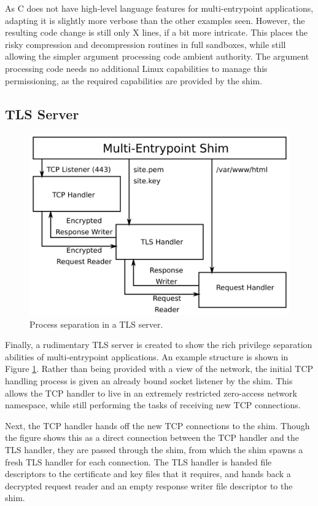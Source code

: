 \documentclass[sigplan]{acmart}
\begin{document}
As C does not have high-level language features for multi-entrypoint applications, adapting it is slightly more verbose than the other examples seen. However, the resulting code change is still only X lines, if a bit more intricate. This places the risky compression and decompression routines in full sandboxes, while still allowing the simpler argument processing code ambient authority. The argument processing code needs no additional Linux capabilities to manage this permissioning, as the required capabilities are provided by the shim.

\subsection{TLS Server}

\begin{figure}
    \centering
    \includegraphics[width=\columnwidth]{figures/tls-server-splitting.png}
    \caption{Process separation in a TLS server.}
    \label{fig:tls-server-splitting}
\end{figure}

Finally, a rudimentary TLS server is created to show the rich privilege separation abilities of multi-entrypoint applications. An example structure is shown in Figure \ref{fig:tls-server-splitting}. Rather than being provided with a view of the network, the initial TCP handling process is given an already bound socket listener by the shim. This allows the TCP handler to live in an extremely restricted zero-access network namespace, while still performing the tasks of receiving new TCP connections.

Next, the TCP handler hands off the new TCP connections to the shim. Though the figure shows this as a direct connection between the TCP handler and the TLS handler, they are passed through the shim, from which the shim spawns a fresh TLS handler for each connection. The TLS handler is handed file descriptors to the certificate and key files that it requires, and hands back a decrypted request reader and an empty response writer file descriptor to the shim.
\end{document}
